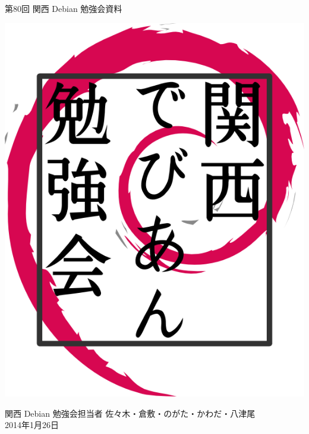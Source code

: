 \documentclass[mingoth,a4paper]{jsarticle}
\newcommand{\debmtgyear}{2014}
\newcommand{\debmtgdate}{26}
\newcommand{\debmtgmonth}{1}
\newcommand{\debmtgnumber}{80}
\begin{document}
\begin{titlepage}


 第\debmtgnumber{}回 関西 Debian 勉強会資料

\vspace{2cm}

\begin{center}
\includegraphics{image200802/kansaidebianlogo.png}
\end{center}

\begin{flushright}
\hfill{}関西 Debian 勉強会担当者 佐々木・倉敷・のがた・かわだ・八津尾 \\
\hfill{}\debmtgyear{}年\debmtgmonth{}月\debmtgdate{}日
\end{flushright}

\thispagestyle{empty}
\end{titlepage}


\vspace{1em}
\end{document}
